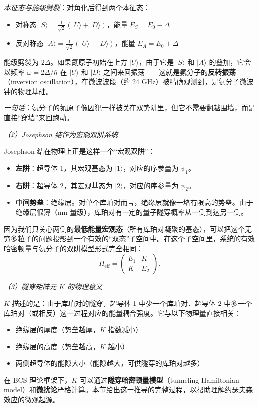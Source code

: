 \textit{本征态与能级劈裂}：对角化后得到两个本征态：
\begin{itemize}[nosep]
    \item 对称态 $|S\rangle = \frac{1}{\sqrt{2}}(|U\rangle+|D\rangle)$，能量 $E_S = E_0 - \Delta$
    \item 反对称态 $|A\rangle = \frac{1}{\sqrt{2}}(|U\rangle-|D\rangle)$，能量 $E_A = E_0 + \Delta$
\end{itemize}
能级劈裂为 $2\Delta$。如果氮原子初始在上方 $|U\rangle$，由于它是 $|S\rangle$ 和 $|A\rangle$ 的叠加，它会以频率 $\omega = 2\Delta/\hbar$ 在 $|U\rangle$ 和 $|D\rangle$ 之间来回振荡——这就是氨分子的\textbf{反转振荡}（inversion oscillation），在微波波段（约 24 GHz）被精确观测到，是氨分子微波钟的物理基础。

\textit{一句话}：氨分子的氮原子像囚犯一样被关在双势阱里，但它不需要翻越围墙，而是直接``穿墙''来回跑动。

\textit{（2）Josephson 结作为宏观双阱系统}

Josephson 结在物理上正是这样一个``宏观双阱''：
\begin{itemize}[nosep]
    \item \textbf{左阱}：超导体 1，其宏观基态为 $|1\rangle$，对应的序参量为 $\psi_1$。
    \item \textbf{右阱}：超导体 2，其宏观基态为 $|2\rangle$，对应的序参量为 $\psi_2$。
    \item \textbf{中间势垒}：绝缘层。对单个库珀对而言，绝缘层就像一堵有限高的势垒。由于绝缘层很薄（nm 量级），库珀对有一定的量子隧穿概率从一侧到达另一侧。
\end{itemize}

因为我们只关心两侧的\textbf{最低能量宏观态}（所有库珀对凝聚的基态），可以把这个无穷多粒子的问题投影到一个有效的``双态''子空间中。在这个子空间里，系统的有效哈密顿量与氨分子的双阱模型形式完全相同：
\[
H_{\text{eff}} = \begin{pmatrix} E_1 & K \\ K & E_2 \end{pmatrix}.
\]

\textit{（3）隧穿矩阵元 $K$ 的物理意义}

$K$ 描述的是：由于库珀对的隧穿，超导体 1 中少一个库珀对、超导体 2 中多一个库珀对（或相反）这一过程对应的能量耦合强度。它与以下物理量直接相关：
\begin{itemize}[nosep]
    \item 绝缘层的厚度（势垒越厚，$K$ 指数减小）
    \item 绝缘层的高度（势垒越高，$K$ 越小）
    \item 两侧超导体的能隙大小（能隙越大，可供隧穿的库珀对越多）
\end{itemize}
在 BCS 理论框架下，$K$ 可以通过\textbf{隧穿哈密顿量模型}（tunneling Hamiltonian model）和\textbf{微扰论}严格计算。本节给出这一推导的完整过程，以帮助理解约瑟夫森效应的微观起源。

